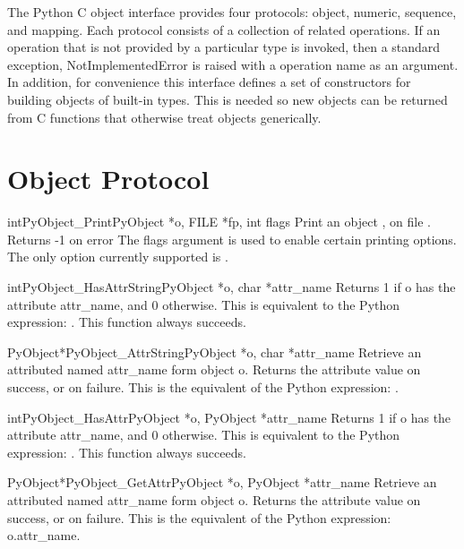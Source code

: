   The Python C object interface provides four protocols: object,
  numeric, sequence, and mapping.  Each protocol consists of a
  collection of related operations.  If an operation that is not
  provided by a particular type is invoked, then a standard exception,
  NotImplementedError is raised with a operation name as an argument.
  In addition, for convenience this interface defines a set of
  constructors for building objects of built-in types.  This is needed
  so new objects can be returned from C functions that otherwise treat
  objects generically.

\section{Object Protocol}

     \begin{cfuncdesc}{int}{PyObject_Print}{PyObject *o, FILE *fp, int flags}
         Print an object , on file .  Returns -1 on error
	 The flags argument is used to enable certain printing
	 options. The only option currently supported is . 
     \end{cfuncdesc}

     \begin{cfuncdesc}{int}{PyObject_HasAttrString}{PyObject *o, char *attr_name}
         Returns 1 if o has the attribute attr_name, and 0 otherwise.
	 This is equivalent to the Python expression:
	 .
	 This function always succeeds.
     \end{cfuncdesc}

     \begin{cfuncdesc}{PyObject*}{PyObject_AttrString}{PyObject *o, char *attr_name}
	 Retrieve an attributed named attr_name form object o.
	 Returns the attribute value on success, or {\NULL} on failure.
	 This is the equivalent of the Python expression: .
     \end{cfuncdesc}


     \begin{cfuncdesc}{int}{PyObject_HasAttr}{PyObject *o, PyObject *attr_name}
         Returns 1 if o has the attribute attr_name, and 0 otherwise.
	 This is equivalent to the Python expression:
	 . 
	 This function always succeeds.
     \end{cfuncdesc}


     \begin{cfuncdesc}{PyObject*}{PyObject_GetAttr}{PyObject *o, PyObject *attr_name}
	 Retrieve an attributed named attr_name form object o.
	 Returns the attribute value on success, or {\NULL} on failure.
	 This is the equivalent of the Python expression: o.attr_name.
     \end{cfuncdesc}


